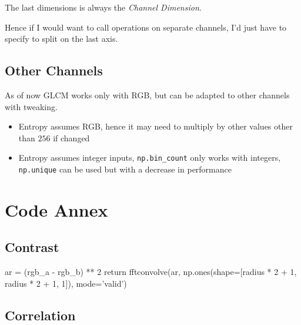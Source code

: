 \documentclass[article,oneside]{memoir}
\begin{document}
The last dimensions is always the \textit{Channel Dimension}.

Hence if I would want to call operations on separate channels, I'd just have to specify to split on the last axis.





\section{Other Channels}

As of now GLCM works only with RGB, but can be adapted to other channels with tweaking.

\begin{itemize}
\item{Entropy assumes RGB, hence it may need to multiply by other values other than $256$ if changed}
\item{Entropy assumes integer inputs, \verb+np.bin_count+ only works with integers, \verb+np.unique+ can be used but with a decrease in performance}
\end{itemize}

\newpage
\chapter{Code Annex}

\section{Contrast}

\begin{python}
ar = (rgb_a - rgb_b) ** 2
     return fftconvolve(ar,
                        np.ones(shape=[radius * 2 + 1,
                                       radius * 2 + 1, 1]),
                        mode='valid')
\end{python}

\section{Correlation}
\end{document}
